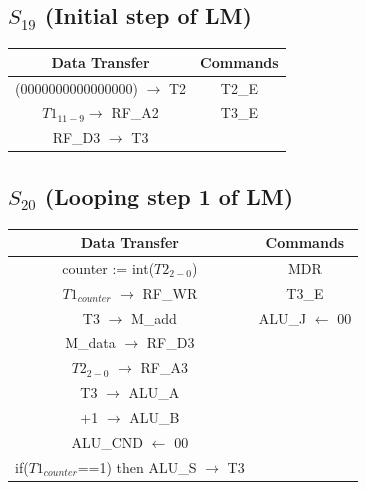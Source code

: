 \documentclass[]{report}
\begin{document}
            \subsection*{$S_{19}$ (Initial step of LM)} %
            \begin{center}
                \begin{tabular}{|c|c|}
                    \hline
                    Data Transfer & Commands \\
                    \hline
                    (0000000000000000) $\to$ T2 & T2\_E\\
                    $T1_{11-9} \to$ RF\_A2 & T3\_E\\
                    RF\_D3 $\to$ T3 & \\     %
                    \hline
                \end{tabular}
            \end{center}    

            \subsection*{$S_{20}$ (Looping step 1 of LM)} %
            \begin{center}
                \begin{tabular}{|c|c|}
                    \hline
                    Data Transfer & Commands \\
                    \hline
                    counter := int($T2_{2-0}$) & MDR\\
                    $T1_{counter}$ $\to$ RF\_WR & T3\_E\\
                    T3 $\to$ M\_add & ALU\_J $\leftarrow$ 00\\
                    M\_data $\to$ RF\_D3 & \\
                    $T2_{2-0}$ $\to$ RF\_A3 & \\
                    T3 $\to$ ALU\_A &\\
                    +1 $\to$ ALU\_B &\\
                    ALU\_CND $\leftarrow$ 00 & \\
                    if($T1_{counter}$==1) then ALU\_S $\to$ T3& \\
                    \hline
                \end{tabular}
            \end{center} 
\end{document}
